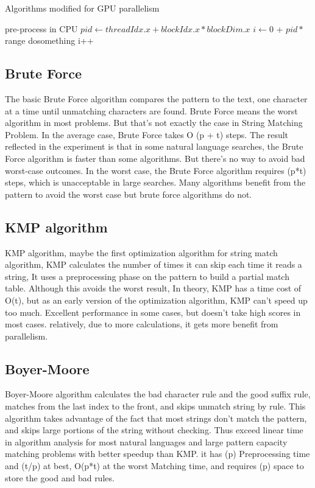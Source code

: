 \documentclass[11pt]{article}       %
\begin{document}
\begin{algorithm}[hbt!]
\caption{Algorithms modified for GPU parallelism}\label{gpuSlice}
pre-process in CPU\;
$pid \gets threadIdx.x + blockIdx.x * blockDim.x$\;
$i \gets 0$ + $pid * $range\;
   { 
  dosomething
  i++\;
 }
\end{algorithm}



\subsection{Brute Force}\label{bf}
The basic Brute Force algorithm compares the pattern to the text, one character at a time until unmatching characters are found. Brute Force means the worst algorithm in most problems. But that's not exactly the case in String Matching Problem. In the average case, Brute Force takes O (p + t) steps. The result reflected in the experiment is that in some natural language searches, the Brute Force algorithm is faster than some algorithms. But there's no way to avoid bad worst-case outcomes. In the worst case, the Brute Force algorithm requires (p*t) steps, which is unacceptable in large searches. Many algorithms benefit from the pattern to avoid the worst case but brute force algorithms do not.

\subsection{KMP algorithm}\label{kmp}
KMP algorithm, maybe the first optimization algorithm\cite{KMP} for string match algorithm, KMP calculates the number of times it can skip each time it reads a string, It uses a preprocessing phase on the pattern to build a partial match table. Although this avoids the worst result, In theory, KMP has a time cost of O(t), but as an early version of the optimization algorithm, KMP can’t speed up too much. Excellent performance in some cases, but doesn’t take high scores in most cases. relatively, due to more calculations, it gets more benefit from parallelism.

\subsection{Boyer-Moore}\label{bm}
Boyer-Moore algorithm calculates the bad character rule and the good suffix rule\cite{BM}, matches from the last index to the front, and skips unmatch string by rule. This algorithm takes advantage of the fact that most strings don’t match the pattern, and skips large portions of the string without checking. Thus exceed linear time in algorithm analysis for most natural languages and large pattern capacity matching problems with better speedup than KMP. it has (p) Preprocessing time and  (t/p) at best, O(p*t) at the worst Matching time, and requires (p) space to store the good and bad rules.
\end{document}
